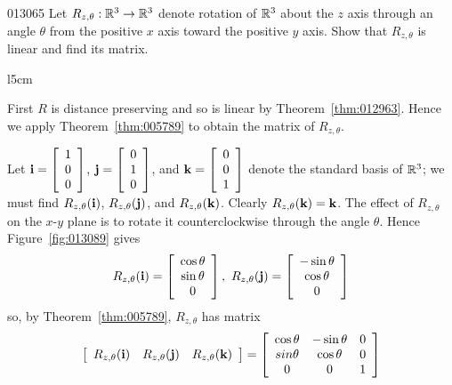 \begin{example}{}{013065}
Let $R_{z,\theta} : \mathbb{R}^3 \to \mathbb{R}^3$ denote rotation of $\mathbb{R}^3$ about the $z$ axis through an angle $\theta$ from the positive $x$ axis toward the positive $y$ axis. Show that $R_{z,\theta}$ is linear and find its matrix.



\begin{wrapfigure}[10]{l}{5cm} 
\centering

\caption{\label{fig:013089}}
\end{wrapfigure}

\setlength{\rightskip}{0pt plus 200pt}
\begin{solution} First $R$ is distance preserving and so is linear by Theorem~\ref{thm:012963}. Hence we apply Theorem~\ref{thm:005789} to obtain the matrix of  $R_{z,\theta}$.

Let $\textbf{i} = \left[
\begin{array}{c}
1 \\
0 \\
0
\end{array}
\right]$, 
$\textbf{j} = \left[
\begin{array}{c}
0 \\
1 \\
0
\end{array}
\right]$, and 
$\textbf{k} = \left[
\begin{array}{c}
0 \\
0 \\
1
\end{array}
\right]$ denote the standard basis of $\mathbb{R}^3$; we must find  $R_{z,\theta}(\textbf{i})$, $R_{z,\theta}(\textbf{j})$, and  $R_{z,\theta}(\textbf{k})$. Clearly  $R_{z,\theta}(\textbf{k}) = \textbf{k}$. The effect of $R_{z,\theta}$ on the $x$-$y$ plane is to rotate it counterclockwise through the angle $\theta$. Hence Figure~\ref{fig:013089} gives
\begin{equation*}
R_{z,\theta}(\textbf{i}) = \left[
\begin{array}{c}
\cos\theta \\
\sin\theta \\
0
\end{array}
\right],\
R_{z,\theta}(\textbf{j}) = \left[
\begin{array}{c}
-\sin\theta \\
\cos\theta \\
0
\end{array}
\right]
\end{equation*}
so, by Theorem~\ref{thm:005789}, $R_{z,\theta}$ has matrix
\begin{equation*}
\left[
\begin{array}{ccc}
R_{z,\theta}(\textbf{i}) &  R_{z,\theta}(\textbf{j}) & R_{z,\theta}(\textbf{k})
\end{array}
\right] = \left[
\begin{array}{ccc}
\cos\theta & -\sin\theta & 0 \\
sin\theta & \cos\theta & 0\\
0 & 0 & 1
\end{array}
\right]
\end{equation*}


\end{solution}
\end{example}
